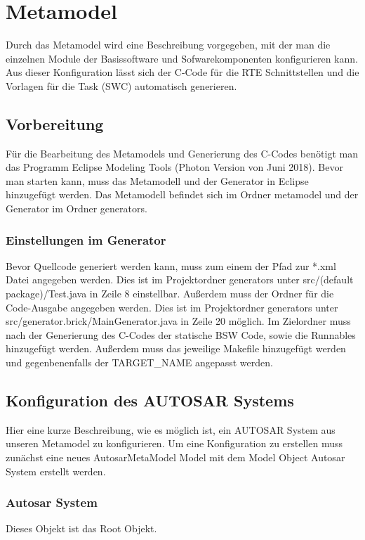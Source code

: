 \chapter{Metamodel}
Durch das Metamodel wird eine Beschreibung vorgegeben, mit der man die einzelnen Module der Basissoftware und Sofwarekomponenten konfigurieren kann. Aus dieser Konfiguration lässt sich der C-Code für die RTE Schnittstellen und die Vorlagen für die Task (SWC) automatisch generieren. 
\section{Vorbereitung}
Für die Bearbeitung des Metamodels und Generierung des C-Codes benötigt man das Programm \frqq{}Eclipse Modeling Tools\flqq{} (Photon Version von Juni 2018). Bevor man starten kann, muss das Metamodell und der Generator in Eclipse hinzugefügt werden. Das Metamodell befindet sich im Ordner \frqq{}metamodel\flqq{} und der Generator im Ordner \frqq{}generators\flqq{}.
\subsection{Einstellungen im Generator}
Bevor Quellcode generiert werden kann, muss zum einem der Pfad zur *.xml Datei angegeben werden. Dies ist im Projektordner \frqq{}generators\flqq{} unter \frqq{}src/(default package)/Test.java\flqq{} in Zeile 8 einstellbar. Außerdem muss der Ordner für die Code-Ausgabe angegeben werden. Dies ist im Projektordner \frqq{}generators\flqq{} unter \frqq{}src/generator.brick/MainGenerator.java\flqq{} in Zeile 20 möglich. Im Zielordner muss nach der Generierung des C-Codes der statische BSW Code, sowie die Runnables hinzugefügt werden. Außerdem muss das jeweilige Makefile hinzugefügt werden und gegenbenenfalls der \frqq{}TARGET\_NAME\flqq{} angepasst werden.

\section{Konfiguration des AUTOSAR Systems}
Hier eine kurze Beschreibung, wie es möglich ist, ein AUTOSAR System aus unseren Metamodel zu konfigurieren. Um eine Konfiguration zu erstellen muss zunächst eine neues AutosarMetaModel Model mit dem Model Object \frqq{}Autosar System\flqq{} erstellt werden.
\subsection{Autosar System}
Dieses Objekt ist das Root Objekt.
